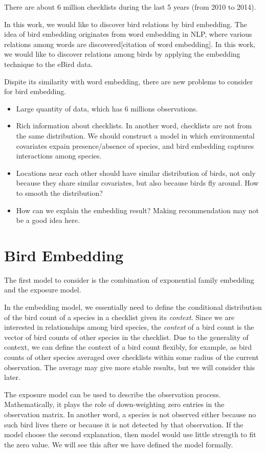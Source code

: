 \documentclass{article}
\begin{document}
There are about 6 million checklists during the last 5 years (from 2010 to 2014). 

In this work, we would like to discover bird relations by bird embedding. The idea of bird embedding originates from word embedding in NLP, where various relations among words are discovered[citation of word embedding]. In this work, we would like to discover relations among birds by applying the embedding technique to the eBird data. 

Dispite its similarity with word embedding, there are new problems to consider for bird embedding. 
\begin{itemize}
\item Large quantity of data, which has 6 millions observations.
\item Rich information about checklists. In another word, checklists are not from the same distribution. We should construct a model in which environmental covariates expain presence/absence of species, and bird embedding captures interactions among species.  
\item Locations near each other should have similar distribution of birds, not only because they share similar covariates, but also because birds fly around. How to smooth the distribution?
\item How can we explain the embedding result? Making recommendation may not be a good idea here. 
\end{itemize}


\section{Bird Embedding}

The first model to consider is the combination of exponential family embedding and the exposure model.

In the embedding model, we essentially need to define the conditional distribution of the bird count of a species in a checklist given its {\it context}. Since we are interested in relationships among bird species, the {\it context} of a bird count is the vector of bird counts of other species in the checklist. Due to the generality of context, we can define the context of a bird count flexibly, for example, as bird counts of other species averaged over checklists within some radius of the current observation. The average may give more stable results, but we will consider this later. 

The exposure model can be used to describe the observation process. Mathematically, it plays the role of down-weighting zero entries in the observation matrix. In another word, a species is not observed either because no such bird lives there or because it is not detected by that observation. If the model choose the second explanation, then model would use little strength to fit the zero value. We will see this after we have defined the model formally.  
\end{document}
